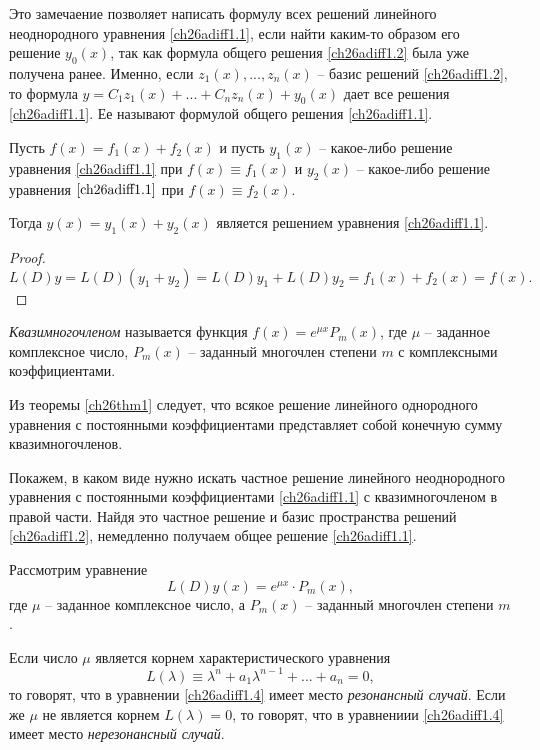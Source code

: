 Это замечаение позволяет написать формулу всех решений линейного неоднородного уравнения \eqref{ch26adiff1.1}, если найти каким-то образом его решение $y_0(x)$, так как формула общего решения \eqref{ch26adiff1.2} была уже получена ранее. Именно, если $z_1(x),...,z_n(x)$ -- базис решений \eqref{ch26adiff1.2}, то формула $y=C_1z_1(x)+...+C_nz_n(x)+y_0(x)$ дает все решения \eqref{ch26adiff1.1}. Ее называют формулой общего решения \eqref{ch26adiff1.1}.

\begin{lemm}
Пусть $f(x)=f_1(x)+f_2(x)$ и пусть $y_1(x)$ -- какое-либо решение уравнения \eqref{ch26adiff1.1} при $f(x)\equiv f_1(x)$ и $y_2(x)$ -- какое-либо решение уравнения $\eqref{ch26adiff1.1}$ при $f(x) \equiv f_2(x)$.

Тогда $y(x)=y_1(x)+y_2(x)$ является решением уравнения \eqref{ch26adiff1.1}.
\end{lemm}

\begin{proof}
\begin{equation*}
L(D)y=L(D)(y_1+y_2)=L(D)y_1+L(D)y_2=f_1(x)+f_2(x)=f(x).\tag*{\qedhere}
\end{equation*}
\end{proof}

\begin{defn}
\textit{Квазимногочленом} называется функция $f(x)=e^{\mu x}P_m(x)$, где $\mu$ -- заданное комплексное число, $P_m(x)$ -- заданный многочлен степени $m$ с комплексными коэффициентами.
\end{defn}

Из теоремы \ref{ch26thm1} следует, что всякое решение линейного однородного уравнения с постоянными коэффициентами представляет собой конечную сумму квазимногочленов.

Покажем, в каком виде нужно искать частное решение линейного неоднородного уравнения с постоянными коэффициентами \eqref{ch26adiff1.1} с квазимногочленом в правой части. Найдя это частное решение и базис пространства решений \eqref{ch26adiff1.2}, немедленно получаем общее решение \eqref{ch26adiff1.1}.

Рассмотрим уравнение
\begin{equation}\label{ch26adiff1.4}
L(D)y(x)=e^{\mu x}\cdot P_m(x),
\end{equation}
где $\mu$ -- заданное комплексное число, а $P_m(x)$ -- заданный многочлен степени $m$.

\begin{defn}
Если число $\mu$ является корнем характеристического уравнения
$$
L(\lambda)\equiv \lambda^n+a_1\lambda^{n-1}+...+a_n=0,
$$
то говорят, что в уравнении \eqref{ch26adiff1.4} имеет место \textit{резонансный случай}. Если же $\mu$ не является корнем $L(\lambda)=0$, то говорят, что в уравнениии \eqref{ch26adiff1.4} имеет место \textit{нерезонансный случай}.
\end{defn}

